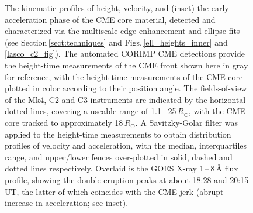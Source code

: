 \documentclass[namedreferences]{solarphysics}
\begin{document}
\begin{article}
\begin{figure}[!t]
\caption{The kinematic profiles of height, velocity, and (inset) the early acceleration phase of the CME core material, detected and characterized via the multiscale edge enhancement and ellipse-fits (see Section\,\ref{sect:techniques} and Figs.\,\ref{ell_heights_inner} and \ref{lasco_c2_fig}). The automated CORIMP CME detections provide the height-time measurements of the CME front shown here in gray for reference, with the height-time measurements of the CME core  plotted in color according to their position angle. The fields-of-view of the Mk4, C2 and C3 instruments are indicated by the horizontal dotted lines, covering a useable range of 1.1\,--\,25\,$R_{\odot}$, with the CME core tracked to approximately 18\,$R_{\odot}$. A Savitzky-Golar filter was applied to the height-time measurements to obtain distribution profiles of velocity and acceleration, with the median, interquartiles range, and upper/lower fences over-plotted in solid, dashed and dotted lines respectively. Overlaid is the GOES X-ray 1\,--\,8\,{\AA} flux profile, showing the double-eruption peaks at about 18:28 and 20:15\,UT, the latter of which coincides with the CME jerk (abrupt increase in acceleration; see inset).}
\label{kins_CMEcore}
\end{figure}


\end{article}
\end{document}
